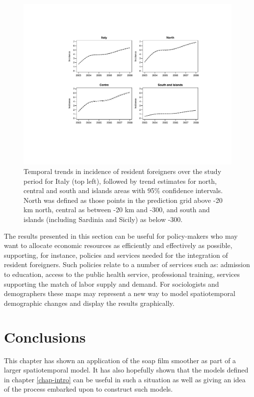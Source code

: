 \begin{figure}[t]
	\centering
		\includegraphics[width=\textwidth]{it/trends.pdf}
	\caption{Temporal trends in incidence of resident foreigners over the study period for Italy (top left), followed by trend estimates for north, central and south and islands areas with 95\% confidence intervals. North was defined as those points in the prediction grid above -20 km north, central as between -20 km and -300, and south and islands (including Sardinia and Sicily) as below -300.}
	\label{trends}
\end{figure}

The results presented in this section can be useful for policy-makers who may want to allocate economic resources as efficiently and effectively as possible, supporting, for instance, policies and services needed for the integration of resident foreigners. Such policies relate to a number of services such as: admission to education, access to the public health service, professional training, services supporting the match of labor supply and demand. For sociologists and demographers these maps may represent a new way to model spatiotemporal demographic changes and display the results graphically. 

\section{Conclusions}
\label{it-conc}

This chapter has shown an application of the soap film smoother as part of a larger spatiotemporal model. It has also hopefully shown that the models defined in chapter \ref{chap-intro} can be useful in such a situation as well as giving an idea of the process embarked upon to construct such models. 

